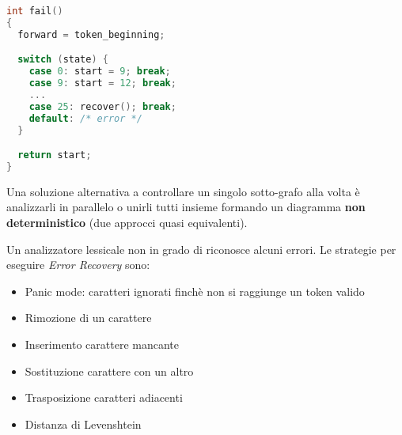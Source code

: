 \begin{lstlisting}[caption=Codice funzione \textit{fail}, language=C]
int fail()
{
  forward = token_beginning;

  switch (state) {
    case 0: start = 9; break;
    case 9: start = 12; break;
    ...
    case 25: recover(); break;
    default: /* error */
  }

  return start;
}
\end{lstlisting}

Una soluzione alternativa a controllare un singolo sotto-grafo alla volta è
analizzarli in parallelo o unirli tutti insieme formando un diagramma
\textbf{non deterministico} (due approcci quasi equivalenti).

Un analizzatore lessicale non in grado di riconosce alcuni errori. Le strategie
per eseguire \textit{Error Recovery} sono:
\begin{itemize}
\item Panic mode: caratteri ignorati finchè non si raggiunge un token valido
\item Rimozione di un carattere
\item Inserimento carattere mancante
\item Sostituzione carattere con un altro
\item Trasposizione caratteri adiacenti
\item Distanza di Levenshtein
\end{itemize}
